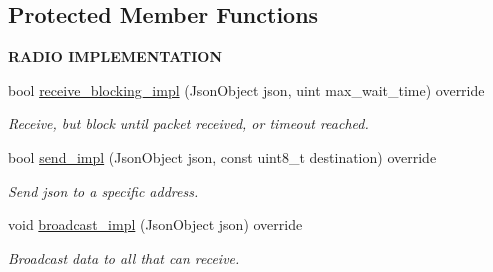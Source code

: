 \subsection*{Protected Member Functions}
\begin{Indent}{\bf R\+A\+D\+IO I\+M\+P\+L\+E\+M\+E\+N\+T\+A\+T\+I\+ON}\par
\begin{DoxyCompactItemize}
\item 
bool \hyperlink{class_loom__n_r_f_a8f4a184813d9aed777997f63e9835e42}{receive\+\_\+blocking\+\_\+impl} (Json\+Object json, uint max\+\_\+wait\+\_\+time) override
\begin{DoxyCompactList}\small\item\em Receive, but block until packet received, or timeout reached. \end{DoxyCompactList}\item 
bool \hyperlink{class_loom__n_r_f_ad63d064b8ae495e699627a3bc2c57fa4}{send\+\_\+impl} (Json\+Object json, const uint8\+\_\+t destination) override
\begin{DoxyCompactList}\small\item\em Send json to a specific address. \end{DoxyCompactList}\item 
void \hyperlink{class_loom__n_r_f_a3e4d0db03fde19d29311338d5f3a979a}{broadcast\+\_\+impl} (Json\+Object json) override
\begin{DoxyCompactList}\small\item\em Broadcast data to all that can receive. \end{DoxyCompactList}\end{DoxyCompactItemize}
\end{Indent}
